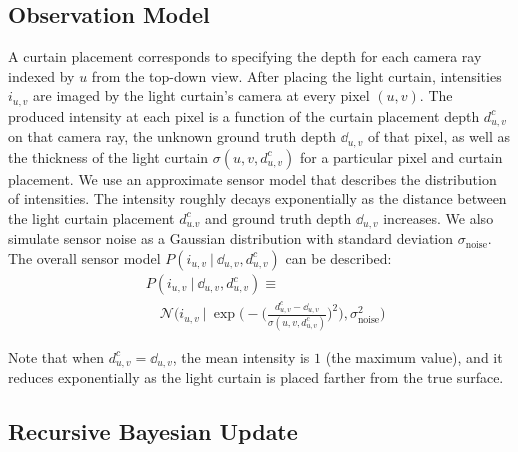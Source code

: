 \subsection{Observation Model}

A curtain placement corresponds to specifying the depth for each camera ray indexed by $u$ from the top-down view. After placing the light curtain, intensities $i_{u,v}$ are imaged by the light curtain's camera at every pixel $(u, v)$. The produced intensity at each pixel is a function of the curtain placement depth $d^c_{u, v}$ on that camera ray, the unknown ground truth depth $\dd_{u, v}$ of that pixel, as well as the thickness of the light curtain $\sigma(u, v, d^c_{u, v})$ for a particular pixel and curtain placement. We use an approximate sensor model that describes the distribution of intensities. The intensity roughly decays exponentially as the distance between the light curtain placement $d^c_{u.v}$ and ground truth depth $\dd_{u, v}$ increases.  We also simulate sensor noise as a Gaussian distribution with standard deviation $\sigma_\text{noise}$. The overall sensor model $P(i_{u, v}\ |\ \dd_{u, v}, d^c_{u, v})$ can be described:
\begin{align}
   &\nonumber P(i_{u, v}\ |\ \dd_{u, v}, d^c_{u, v}) \equiv\\
   &\quad \mathcal{N} \Big(i_{u, v}\ |\ \exp \Big(-\Bigg(\frac{d^c_{u, v} - \dd_{u, v}}{\sigma(u, v, d^c_{u, v})}\Bigg)^2\Big), \sigma_\text{noise}^2\Big)
   \label{eqn:sensor_model}
\end{align}

Note that when $d^c_{u, v} = \dd_{u, v}$, the mean intensity is $1$ (the maximum value), and it reduces exponentially as the light curtain is placed farther from the true surface.

\subsection{Recursive Bayesian Update}
\newcommand{\qb}{q'}
\newcommand{\before}[1]{{P_\text{prev}(u, v, #1)}}
\newcommand{\after}[1]{{P_\text{next}(u, v, #1)}}

